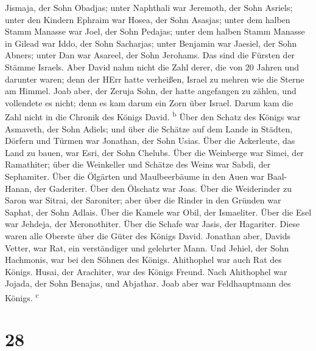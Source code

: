 Jismaja, der Sohn Obadjas; unter Naphthali war Jeremoth, der Sohn
Asriels;  unter den Kindern Ephraim war Hosea, der Sohn
Asasjas; unter dem halben Stamm Manasse war Joel, der Sohn Pedajas;
 unter dem halben Stamm Manasse in Gilead war Iddo, der
Sohn Sacharjas; unter Benjamin war Jaesiel, der Sohn Abners;
 unter Dan war Asareel, der Sohn Jerohams. Das sind die
Fürsten der Stämme Israels.  Aber David nahm nicht die
Zahl derer, die von 20 Jahren und darunter waren; denn der HErr hatte
verheißen, Israel zu mehren wie die Sterne am Himmel. 
Joab aber, der Zeruja Sohn, der hatte angefangen zu zählen, und
vollendete es nicht; denn es kam darum ein Zorn über Israel. Darum kam
die Zahl nicht in die Chronik des Königs David. \textsuperscript{b}
 Über den Schatz des Königs war Asmaveth, der Sohn
Adiels; und über die Schätze auf dem Lande in Städten, Dörfern und
Türmen war Jonathan, der Sohn Usias.  Über die
Ackerleute, das Land zu bauen, war Esri, der Sohn Chelubs.
 Über die Weinberge war Simei, der Ramathiter; über die
Weinkeller und Schätze des Weins war Sabdi, der Sephamiter.
 Über die Ölgärten und Maulbeerbäume in den Auen war
Baal-Hanan, der Gaderiter. Über den Ölschatz war Joas. 
Über die Weiderinder zu Saron war Sitrai, der Saroniter; aber über die
Rinder in den Gründen war Saphat, der Sohn Adlais.  Über
die Kamele war Obil, der Ismaeliter. Über die Esel war Jehdeja, der
Meronothiter.  Über die Schafe war Jasis, der Hagariter.
Diese waren alle Oberste über die Güter des Königs David.
 Jonathan aber, Davids Vetter, war Rat, ein verständiger
und gelehrter Mann. Und Jehiel, der Sohn Hachmonis, war bei den Söhnen
des Königs.  Ahithophel war auch Rat des Königs. Husai,
der Arachiter, war des Königs Freund.  Nach Ahithophel
war Jojada, der Sohn Benajas, und Abjathar. Joab aber war Feldhauptmann
des Königs. \textsuperscript{c}

\hypertarget{section-27}{%
\section{28}\label{section-27}}

